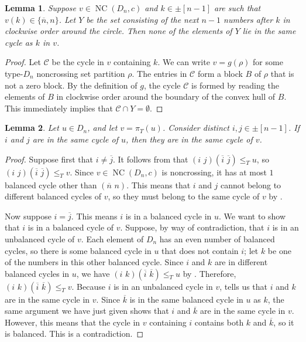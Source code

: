 \documentclass[10pt,a4paper]{amsart}
\newtheorem{lemma}[lemma]{Lemma}
\DeclareMathOperator{\NC}{NC}
\begin{document}
\begin{lemma}\label{Lem3}
Suppose $v\in \NC(D_n,c)$ and $k\in\pm[n-1]$ are such that $v(k)\in\{\overline n,n\}$. Let $Y$ be the set consisting of the next $n-1$ numbers after $k$ in clockwise order around the circle. Then none of the elements of $Y$ lie in the same cycle as $k$ in $v$.  
\end{lemma}

\begin{proof}
Let $\mathcal C$ be the cycle in $v$ containing $k$. We can write $v=g(\rho)$ for some type-$D_n$ noncrossing set partition $\rho$. The entries in $\mathcal C$ form a block $B$ of $\rho$ that is not a zero block. By the definition of $g$, the cycle $\mathcal C$ is formed by reading the elements of $B$ in clockwise order around the boundary of the convex hull of $B$. This immediately implies that $\mathcal C\cap Y=\emptyset$.  
\end{proof}

\begin{lemma}\label{Lem2}
Let $u\in D_n$, and let $v=\pi_T(u)$. Consider distinct $i,j\in\pm[n-1]$. If $i$ and $j$ are in the same cycle of $u$, then they are in the same cycle of $v$.   
\end{lemma}

\begin{proof}
Suppose first that $i\neq \overline j$. It follows from  that $(i\,\,j)(\overline i\,\,\overline j)\leq_T u$, so $(i\,\,j)(\overline i\,\,\overline j)\leq_T v$. Since $v\in\NC(D_n,c)$ is noncrossing, it has at most $1$ balanced cycle other than $(\overline n\,\,n)$. This means that $i$ and $j$ cannot belong to different balanced cycles of $v$, so they must belong to the same cycle of $v$ by . 

Now suppose $i=\overline j$. This means $i$ is in a balanced cycle in $u$. We want to show that $i$ is in a balanced cycle of $v$. Suppose, by way of contradiction, that $i$ is in an unbalanced cycle of $v$. Each element of $D_n$ has an even number of balanced cycles, so there is some balanced cycle in $u$ that does not contain $i$; let $k$ be one of the numbers in this other balanced cycle. Since $i$ and $k$ are in different balanced cycles in $u$, we have $(i\,\,k)(\overline i\,\,\overline k)\leq_T u$ by . Therefore, $(i\,\,k)(\overline i\,\,\overline k)\leq_T v$. Because $i$ is in an unbalanced cycle in $v$,  tells us that $i$ and $k$ are in the same cycle in $v$. Since $\overline k$ is in the same balanced cycle in $u$ as $k$, the same argument we have just given shows that $i$ and $\overline k$ are in the same cycle in $v$. However, this means that the cycle in $v$ containing $i$ contains both $k$ and $\overline k$, so it is balanced. This is a contradiction.     
\end{proof}
\end{document}
